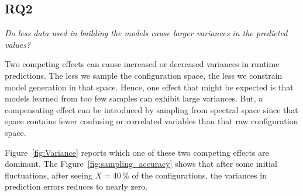 \documentclass{newsig}
\newcommand{\fig}[1]{Figure~\ref{fig:#1}}
\begin{document}
\subsection{RQ2}

\begin{center}
{\em
Do less data used in building the models cause larger variances in the predicted values?}
\end{center}


Two competing effects can cause increased or decreased  variances in 
runtime predictions.
The   less we sample the configuration space,
the less we constrain model generation in that space. Hence, one effect that might be expected
is that models learned
from too few samples can exhibit large variances. 
But,
a  compensating effect can be introduced by sampling from spectral space
since that space contains fewer confusing or correlated variables than that raw configuration space.

\fig{Variance} reports which one of these two competing effects are dominant. 
The \fig{sampling_accuracy} shows that after some initial fluctuations,
after seeing $X=40$\,\% of the configurations, the variances in prediction errors reduces to nearly zero.
\end{document}

